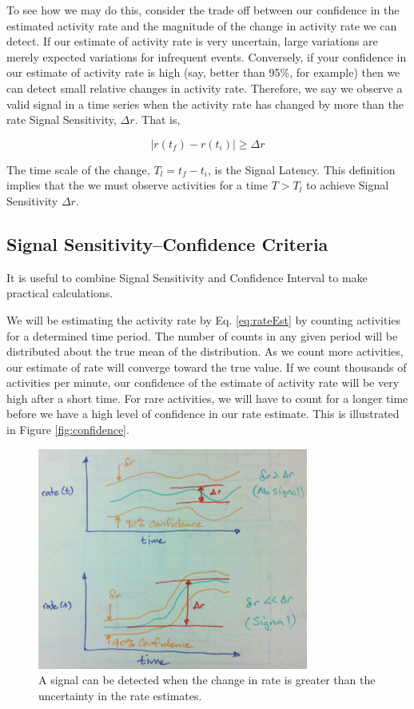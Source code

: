 \documentclass{article}
\begin{document}
To see how we may do this, consider the trade off between our confidence in the estimated activity rate and the magnitude of the change in activity rate we can detect.  If our estimate of activity rate is very uncertain, large variations are merely expected variations for infrequent events.  Conversely, if your confidence in our estimate of activity rate is high (say, better than 95\%, for example) then we can detect small relative changes in activity rate.  Therefore, we say we observe a valid signal in a time series when the activity rate has changed by more than the rate Signal Sensitivity, $\Delta r$.  That is,

\begin{equation}
    \label{eq:signal}
    | r(t_f) - r(t_i) | \geq \Delta r
\end{equation}

The time scale of the change, $T_l = t_f - t_i$, is the Signal Latency.  This definition implies that the we must observe activities for a time $T > T_l$ to achieve Signal Sensitivity $\Delta r$.

\subsection{Signal Sensitivity--Confidence Criteria} 

It is useful to combine Signal Sensitivity and Confidence Interval to make practical calculations. 

We will be estimating the activity rate by Eq. \ref{eq:rateEst} by counting activities for a determined time period.  The number of counts in any given period will be distributed about the true mean of the distribution. As we count more activities, our estimate of rate will converge toward the true value.  If we count thousands of activities per minute, our confidence of the estimate of activity rate will be very high after a short time.  For rare activities, we will have to count for a longer time before we have a high level of confidence in our rate estimate. This is illustrated in Figure \ref{fig:confidence}.

%
\begin{figure}[h]
    \centering
    \includegraphics[width=3.5in]{./imgs/signal.jpg}
        \caption{A signal can be detected when the change in rate is greater than the uncertainty in the rate estimates.}
    \label{fig:signal}
\end{figure}
%
%
\end{document}

